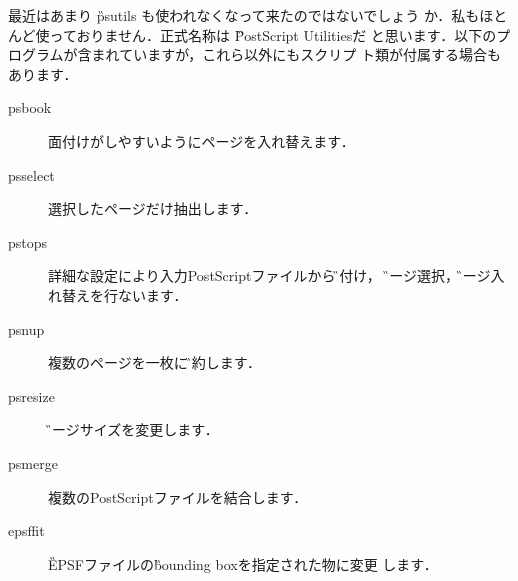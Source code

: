 \begin{description}
 最近はあまり \G{psutils} も使われなくなって来たのではないでしょう
 か．私もほとんど使っておりません．正式名称は \G{PostScript Utilities}だ
 と思います．以下のプログラムが含まれていますが，これら以外にもスクリプ
 ト類が付属する場合もあります．
\begin{description}
  \item[psbook] 面付けがしやすいようにページを入れ替えます．
  \item[psselect] 選択したページだけ抽出します．
  \item[pstops]  詳細な設定により入力PostScriptファイルから\G{面付け}，
	     \G{ページ選択}，\G{ページ入れ替え}を行ないます．
  \item[psnup] 複数のページを一枚に\G{集約}します．
  \item[psresize] \G{ページサイズ}を変更します．
  \item[psmerge] 複数のPostScriptファイルを結合します．
  \item[epsffit] \G{EPSFファイル}の\G{bounding box}を指定された物に変更
	     します．
\end{description}
\end{description}

